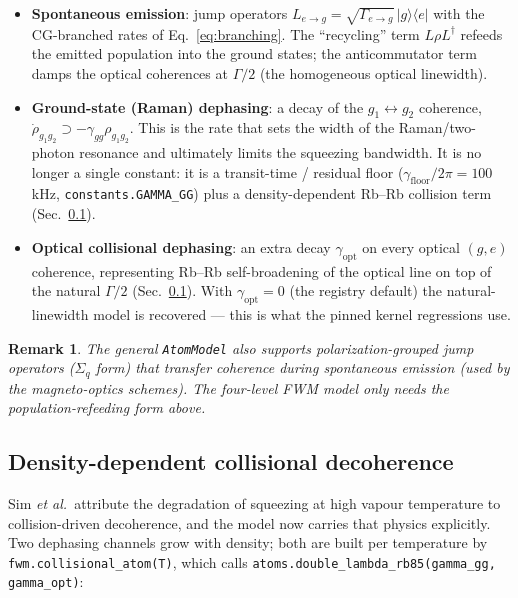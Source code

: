 \documentclass[11pt]{article}
\newcommand{\ketbra}[2]{\lvert #1 \rangle\!\langle #2 \rvert}
\newcommand{\code}[1]{\texttt{#1}}
\newtheorem{remark}{Remark}
\begin{document}
\begin{itemize}[leftmargin=1.6em]
  \item \textbf{Spontaneous emission}: jump operators
  $L_{e\to g}=\sqrt{\Gamma_{e\to g}}\,\ketbra{g}{e}$ with the CG-branched rates of
  Eq.~\eqref{eq:branching}. The ``recycling'' term $L\rho L^\dagger$ refeeds the
  emitted population into the ground states; the anticommutator term damps the
  optical coherences at $\Gamma/2$ (the homogeneous optical linewidth).
  \item \textbf{Ground-state (Raman) dephasing}: a decay of the
  $g_1\!\leftrightarrow\!g_2$ coherence,
  $\dot\rho_{g_1g_2}\supset-\gamma_{gg}\rho_{g_1g_2}$. This is the rate that
  sets the width of the Raman/two-photon resonance and ultimately limits the
  squeezing bandwidth. It is no longer a single constant: it is a transit-time /
  residual floor ($\gamma_{\text{floor}}/2\pi=100\,$kHz,
  \code{constants.GAMMA\_GG}) plus a density-dependent Rb--Rb collision term
  (Sec.~\ref{sec:collisional}).
  \item \textbf{Optical collisional dephasing}: an extra decay
  $\gamma_{\text{opt}}$ on every optical $(g,e)$ coherence, representing Rb--Rb
  self-broadening of the optical line on top of the natural $\Gamma/2$
  (Sec.~\ref{sec:collisional}). With $\gamma_{\text{opt}}=0$ (the registry
  default) the natural-linewidth model is recovered --- this is what the pinned
  kernel regressions use.
\end{itemize}

\begin{remark}
The general \code{AtomModel} also supports \emph{polarization-grouped} jump
operators ($\Sigma_q$ form) that transfer coherence during spontaneous emission
(used by the magneto-optics schemes). The four-level FWM model only needs the
population-refeeding form above.
\end{remark}

\subsection{Density-dependent collisional decoherence}
\label{sec:collisional}

Sim \emph{et al.}\ attribute the degradation of squeezing at high vapour
temperature to collision-driven decoherence, and the model now carries that
physics explicitly. Two dephasing channels grow with density; both are built per
temperature by \code{fwm.collisional\_atom(T)}, which calls
\code{atoms.double\_lambda\_rb85(gamma\_gg, gamma\_opt)}:
\end{document}
